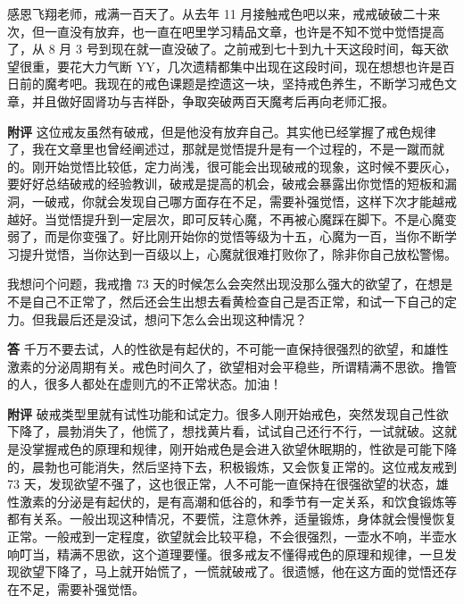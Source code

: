 \begin{case}
    感恩飞翔老师，戒满一百天了。从去年 11 月接触戒色吧以来，戒戒破破二十来次，但一直没有放弃，也一直在吧里学习精品文章，也许是不知不觉中觉悟提高了，从 8 月 3 号到现在就一直没破了。之前戒到七十到九十天这段时间，每天欲望很重，要花大力气断 YY，几次遗精都集中出现在这段时间，现在想想也许是百日前的魔考吧。我现在的戒色课题是控遗这一块，坚持戒色养生，不断学习戒色文章，并且做好固肾功与吉祥卧，争取突破两百天魔考后再向老师汇报。

    \textbf{附评} 这位戒友虽然有破戒，但是他没有放弃自己。其实他已经掌握了戒色规律了，我在文章里也曾经阐述过，那就是觉悟提升是有一个过程的，不是一蹴而就的。刚开始觉悟比较低，定力尚浅，很可能会出现破戒的现象，这时候不要灰心，要好好总结破戒的经验教训，破戒是提高的机会，破戒会暴露出你觉悟的短板和漏洞，一破戒，你就会发现自己哪方面存在不足，需要补强觉悟，这样下次才能越戒越好。当觉悟提升到一定层次，即可反转心魔，不再被心魔踩在脚下。不是心魔变弱了，而是你变强了。好比刚开始你的觉悟等级为十五，心魔为一百，当你不断学习提升觉悟，当你达到一百级以上，心魔就很难打败你了，除非你自己放松警惕。
\end{case}

\begin{case}
    我想问个问题，我戒撸 73 天的时候怎么会突然出现没那么强大的欲望了，在想是不是自己不正常了，然后还会生出想去看黄检查自己是否正常，和试一下自己的定力。但我最后还是没试，想问下怎么会出现这种情况？

    \textbf{答} 千万不要去试，人的性欲是有起伏的，不可能一直保持很强烈的欲望，和雄性激素的分泌周期有关。戒色时间久了，欲望相对会平稳些，所谓精满不思欲。撸管的人，很多人都处在虚则亢的不正常状态。加油！

    \textbf{附评} 破戒类型里就有试性功能和试定力。很多人刚开始戒色，突然发现自己性欲下降了，晨勃消失了，他慌了，想找黄片看，试试自己还行不行，一试就破。这就是没掌握戒色的原理和规律，刚开始戒色是会进入欲望休眠期的，性欲是可能下降的，晨勃也可能消失，然后坚持下去，积极锻炼，又会恢复正常的。这位戒友戒到 73 天，发现欲望不强了，这也很正常，人不可能一直保持在很强欲望的状态，雄性激素的分泌是有起伏的，是有高潮和低谷的，和季节有一定关系，和饮食锻炼等都有关系。一般出现这种情况，不要慌，注意休养，适量锻炼，身体就会慢慢恢复正常。一般戒到一定程度，欲望就会比较平稳，不会很强烈，一壶水不响，半壶水响叮当，精满不思欲，这个道理要懂。很多戒友不懂得戒色的原理和规律，一旦发现欲望下降了，马上就开始慌了，一慌就破戒了。很遗憾，他在这方面的觉悟还存在不足，需要补强觉悟。
\end{case}

